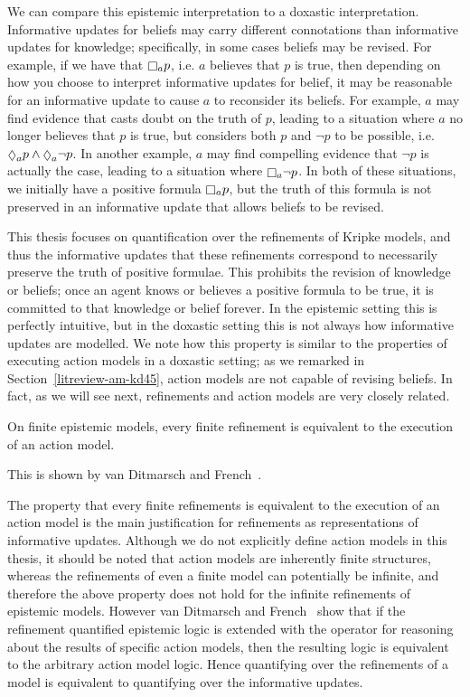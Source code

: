 We can compare this epistemic interpretation to a doxastic interpretation.
Informative updates for beliefs may carry different connotations than
informative updates for knowledge; specifically, in some cases beliefs may be
revised. For example, if we have that $\knows_a p$, i.e. $a$ believes that $p$
is true, then depending on how you choose to interpret informative updates for
belief, it may be reasonable for an informative update to cause $a$ to
reconsider its beliefs. For example, $a$ may find evidence that casts doubt on
the truth of $p$, leading to a situation where $a$ no longer believes that $p$
is true, but considers both $p$ and $\neg p$ to be possible, i.e. $\suspects_a p
\land \suspects_a \neg p$. In another example, $a$ may find compelling evidence
that $\neg p$ is actually the case, leading to a situation where $\knows_a \neg
p$. In both of these situations, we initially have a positive formula $\knows_a
p$, but the truth of this formula is not preserved in an informative update that
allows beliefs to be revised.

This thesis focuses on quantification over the refinements of Kripke models, and
thus the informative updates that these refinements correspond to necessarily
preserve the truth of positive formulae. This prohibits the revision of
knowledge or beliefs; once an agent knows or believes a positive formula to be
true, it is committed to that knowledge or belief forever. In the epistemic
setting this is perfectly intuitive, but in the doxastic setting this is not
always how informative updates are modelled. We note how this property is
similar to the properties of executing action models in a doxastic setting; as
we remarked in Section~\ref{litreview-am-kd45}, action models are not capable of
revising beliefs. In fact, as we will see next, refinements and action models
are very closely related.

\begin{proposition}
On finite epistemic models, every finite refinement is equivalent to the
execution of an action model.
\end{proposition}

This is shown by van Ditmarsch and French~\cite{french2009simulation}.

The property that every finite refinements is equivalent to the execution of an
action model is the main justification for refinements as representations of
informative updates. Although we do not explicitly define action models in this
thesis, it should be noted that action models are inherently finite structures,
whereas the refinements of even a finite model can potentially be infinite, and
therefore the above property does not hold for the infinite refinements of
epistemic models. However van Ditmarsch and French~\cite{french2009simulation}
show that if the refinement quantified epistemic logic is extended with the
operator for reasoning about the results of specific action models, then the
resulting logic is equivalent to the arbitrary action model logic. Hence
quantifying over the refinements of a model is equivalent to quantifying over
the informative updates.

